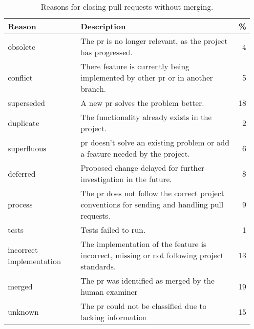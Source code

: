 \documentclass{sig-alternate}
\begin{document}
\begin{table}[t]
  \begin{small}
  \centering
  \begin{tabular}{p{6em}p{18em}r}
    \hline
    \textbf{Reason} & \textbf{Description} & \textbf{\%}
\\
    \hline
    \textsf{obsolete} &	The {\sc pr} is no longer relevant, as the project
    has progressed. & 4\\

    \textsf{conflict} &	There feature is currently being implemented by other
    {\sc pr} or in another branch. & 5\\

    \textsf{superseded} &	A new {\sc pr} solves the problem better. & 18\\

    \textsf{duplicate} & The functionality already exists in the project. & 2 \\

    \textsf{superfluous} & {\sc pr} doesn't solve an existing problem or add a
    feature needed by the project. & 6 \\

    \textsf{deferred} & Proposed change delayed for further investigation in the
    future. & 8\\

    \textsf{process} & The {\sc pr} does not follow the correct project
    conventions for sending and handling pull requests. & 9\\
    
    \textsf{tests} & Tests failed to run. & 1\\

    \textsf{incorrect implementation} &	The implementation of the feature is
    incorrect, missing or not following project standards. & 13\\

    \hline 
    \textsf{merged} & The {\sc pr} was identified as merged by the human
    examiner & 19\\

    \textsf{unknown} & The {\sc pr} could not be classified due to lacking
    information & 15 \\

    \hline
  \end{tabular}
\end{small}
\caption{Reasons for closing pull requests without merging.}
\label{tab:unmerged}
\end{table}
\end{document}
